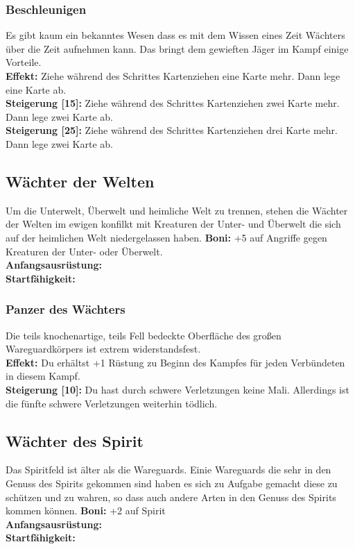 \subsubsection*{Beschleunigen} \label{sk:beschleunigen}
Es gibt kaum ein bekanntes Wesen dass es mit dem Wissen eines Zeit Wächters über die Zeit aufnehmen kann. Das bringt dem gewieften Jäger im Kampf einige Vorteile.\\
\textbf{Effekt:} Ziehe während des Schrittes Kartenziehen eine Karte mehr. Dann lege eine Karte ab.\\
\textbf{Steigerung [15]:} Ziehe während des Schrittes Kartenziehen zwei Karte mehr. Dann lege zwei Karte ab.\\
\textbf{Steigerung [25]:} Ziehe während des Schrittes Kartenziehen drei Karte mehr. Dann lege zwei Karte ab.


\subsection*{Wächter der Welten}
Um die Unterwelt, Überwelt und heimliche Welt zu trennen, stehen die Wächter der Welten im ewigen konfilkt mit Kreaturen der Unter- und Überwelt die sich auf der heimlichen Welt niedergelassen haben.
\textbf{Boni:}  +5 auf Angriffe gegen Kreaturen der Unter- oder Überwelt.\\
\textbf{Anfangsausrüstung:} \\
\textbf{Startfähigkeit:}  \\

\subsubsection*{Panzer des Wächters} \label{sk:panzer_des_waechters}
Die teils knochenartige, teils Fell bedeckte Oberfläche des großen Wareguardkörpers ist extrem widerstandsfest.\\
\textbf{Effekt:} Du erhältst +1 Rüstung zu Beginn des Kampfes für jeden Verbündeten in diesem Kampf.\\
\textbf{Steigerung [10]:} Du hast durch schwere Verletzungen keine Mali. Allerdings ist die fünfte schwere Verletzungen weiterhin tödlich.


\subsection*{Wächter des Spirit}
Das Spiritfeld ist älter als die Wareguards. Einie Wareguards die sehr in den Genuss des Spirits gekommen sind haben es sich zu Aufgabe gemacht diese zu schützen und zu wahren, so dass auch andere Arten in den Genuss des Spirits kommen können.
\textbf{Boni:}  +2 auf Spirit\\
\textbf{Anfangsausrüstung:} \\
\textbf{Startfähigkeit:}  \\

